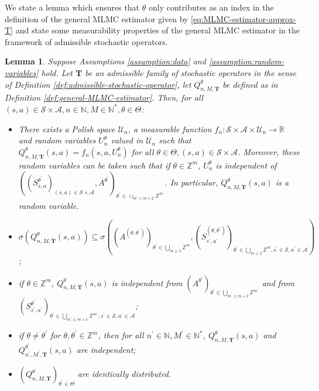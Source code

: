\documentclass[11pt]{article}
\numberwithin{equation}{section}
\newtheorem{lemma}[theorem]{Lemma}
\theoremstyle{definition}
\theoremstyle{remark}
\def\N{{\mathbb{N}}}
\def\R{{\mathbb R}}
\def\Z{{\mathbb{Z}}}
\begin{document}
We state a lemma which ensures that $\theta$ only contributes as an index in the definition of the general MLMC estimator given by \eqref{eq:MLMC-estimator-approx-T} and state some measurability properties of the general MLMC estimator in the framework of admissible stochastic operators.
\begin{lemma}
    \label{lemma:theta-is-just-an-index}
    Suppose Assumptions \ref{assumption:data} and \ref{assumption:random-variables} hold. Let $\mathbf T$ be an admissible family of stochastic operators in the sense of Definition \ref{def:admissible-stochastic-operator}, let $Q^\theta_{n,M,\mathbf T}$ be defined as in Definition \ref{def:general-MLMC-estimator}. Then, for all $(s,a) \in \mathcal S \times \mathcal A, n \in \N, M \in \N^*, \theta \in \Theta$:
    \begin{itemize}
	    \item[(i)] There exists a Polish space $\mathcal U_n$, a measurable function $f_n : \mathcal S \times \mathcal A \times \mathcal U_n \rightarrow \R$ and random variables $U_n^\theta$ valued in $\mathcal U_n$ such that $Q_{n,M,\mathbf T}^\theta(s,a) = f_n(s,a,U_n^\theta)$ for all $\theta \in \Theta, (s,a) \in \mathcal S \times \mathcal A$. Moreover, these random variables can be taken such that if $\theta \in \Z^m$, $U^{\theta}_n$ is independent of $\left((S^{\theta^\prime}_{s,a})_{(s,a)\in \mathcal S \times \mathcal A}, A^{\theta^\prime} \right)_{\theta^\prime \in \cup_{m^\prime < m + 2} \Z^{m^\prime}}$. In particular, $Q^\theta_{n,M,\mathbf T}(s,a)$ is a random variable.
        
        \item[(ii)] $\sigma \left(Q^\theta_{n,M,\mathbf T}(s,a)\right) \subseteq \sigma \left(\left(A^{(\theta,\theta^\prime)}\right)_{\theta^\prime \in \bigcup_{m \geq 3}\Z^m}, \left(S^{(\theta,\theta^\prime)}_{s^\prime, a^\prime}\right)_{\theta^\prime \in  \bigcup_{m \geq 2}\Z^m, s^\prime \in \mathcal S, a^\prime \in \mathcal A}\right)$;
        
        \item[(iii)] if $\theta \in \Z^m$, $Q^\theta_{n,M,\mathbf T}(s,a)$ is independent from $\left(A^{\theta^\prime}\right)_{\theta^\prime \in \bigcup_{m^\prime \leq m + 2}\Z^{m^\prime}}$ and from \\ $\left(S^{\theta^\prime}_{s^\prime, a^\prime}\right)_{\theta^\prime \in  \bigcup_{m^\prime \leq m + 1}\Z^{m^\prime}, s^\prime \in \mathcal S, a^\prime \in \mathcal A}$;
        
        \item[(iv)] if $\theta \neq \theta^\prime$ for $\theta, \theta^\prime \in \Z^m$, then for all $n^\prime \in \N, M^\prime \in \N^*$, $Q^\theta_{n,M,\mathbf T}(s,a)$ and $Q^{\theta^\prime}_{n^\prime, M^\prime, \mathbf T}(s,a)$ are independent;
        \item[(v)] $\left(Q^{\theta^\prime}_{n,M,\mathbf T} \right)_{\theta^\prime \in \Theta}$ are identically distributed.
    \end{itemize}
\end{lemma}
\end{document}
